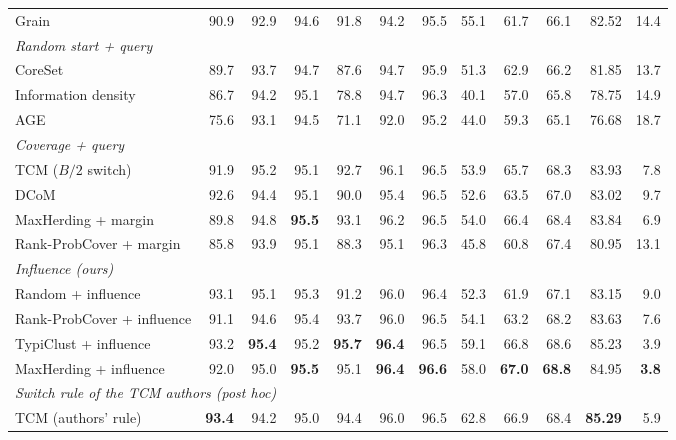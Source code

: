 \begin{table}[t]
\begin{adjustbox}{max width=\textwidth}
\begin{tabular}{lrrrrrrrrrrr}
\quad Grain~\cite{zhang2021grain} & 90.9 & 92.9 & 94.6 & 91.8 & 94.2 & 95.5 & 55.1 & 61.7 & 66.1 & 82.52 & 14.4 \\
\multicolumn{12}{l}{\textit{Random start + query}} \\
\quad CoreSet~\cite{sener2017active} & 89.7 & 93.7 & 94.7 & 87.6 & 94.7 & 95.9 & 51.3 & 62.9 & 66.2 & 81.85 & 13.7 \\
\quad Information density~\cite{settles2008analysis} & 86.7 & 94.2 & 95.1 & 78.8 & 94.7 & 96.3 & 40.1 & 57.0 & 65.8 & 78.75 & 14.9 \\
\quad AGE~\cite{cai2017active} & 75.6 & 93.1 & 94.5 & 71.1 & 92.0 & 95.2 & 44.0 & 59.3 & 65.1 & 76.68 & 18.7 \\
\multicolumn{12}{l}{\textit{Coverage + query}} \\
\quad TCM ($B/2$ switch)~\cite{doucet2024bridging} & 91.9 & 95.2 & 95.1 & 92.7 & 96.1 & 96.5 & 53.9 & 65.7 & 68.3 & 83.93 & 7.8 \\
\quad DCoM~\cite{mishal2024dcom} & 92.6 & 94.4 & 95.1 & 90.0 & 95.4 & 96.5 & 52.6 & 63.5 & 67.0 & 83.02 & 9.7 \\
\quad MaxHerding + margin & 89.8 & 94.8 & \textbf{95.5} & 93.1 & 96.2 & 96.5 & 54.0 & 66.4 & 68.4 & 83.84 & 6.9 \\
\quad Rank-ProbCover + margin & 85.8 & 93.9 & 95.1 & 88.3 & 95.1 & 96.3 & 45.8 & 60.8 & 67.4 & 80.95 & 13.1 \\
\multicolumn{12}{l}{\textit{Influence (ours)}} \\
\quad Random + influence & 93.1 & 95.1 & 95.3 & 91.2 & 96.0 & 96.4 & 52.3 & 61.9 & 67.1 & 83.15 & 9.0 \\
\quad Rank-ProbCover + influence & 91.1 & 94.6 & 95.4 & 93.7 & 96.0 & 96.5 & 54.1 & 63.2 & 68.2 & 83.63 & 7.6 \\
\quad TypiClust + influence & 93.2 & \textbf{95.4} & 95.2 & \textbf{95.7} & \textbf{96.4} & 96.5 & 59.1 & 66.8 & 68.6 & 85.23 & 3.9 \\
\quad MaxHerding + influence & 92.0 & 95.0 & \textbf{95.5} & 95.1 & \textbf{96.4} & \textbf{96.6} & 58.0 & \textbf{67.0} & \textbf{68.8} & 84.95 & \textbf{3.8} \\
\multicolumn{12}{l}{\textit{Switch rule of the TCM authors (post hoc)}} \\
\quad TCM (authors' rule)~\cite{doucet2024bridging} & \textbf{93.4} & 94.2 & 95.0 & 94.4 & 96.0 & 96.5 & 62.8 & 66.9 & 68.4 & \textbf{85.29} & 5.9 \\
\bottomrule
\end{tabular}
\end{adjustbox}
\end{table}
